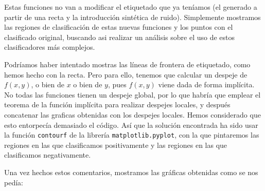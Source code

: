 \documentclass[11pt]{article}
\begin{document}
Estas funciones no van a modificar el etiquetado que ya teníamos (el generado a partir de una recta y la introducción sintética de ruido). Simplemente mostramos las regiones de clasificación de estas nuevas funciones y los puntos con el clasificado original, buscando asi realizar un análisis sobre el uso de estos clasificadores más complejos.

Podríamos haber intentado mostras las líneas de frontera de etiquetado, como hemos hecho con la recta. Pero para ello, tenemos que calcular un despeje de $f(x, y)$, o bien de $x$ o bien de $y$, pues $f(x, y)$ viene dada de forma implícita. No todas las funciones tienen un despeje global, por lo que habría que emplear el teorema de la función implícita para realizar despejes locales, y después concatenar las graficas obtenidas con los despejes locales. Hemos considerado que esto entorpecía demasiado el código. Así que la solución encontrada ha sido usar la función \lstinline{contourf} de la librería \lstinline{matplotlib.pyplot}, con la que pintaremos las regiones en las que clasificamos positivamente y las regiones en las que clasificamos negativamente.

Una vez hechos estos comentarios, mostramos las gráficas obtenidas como se nos pedía:
\end{document}
